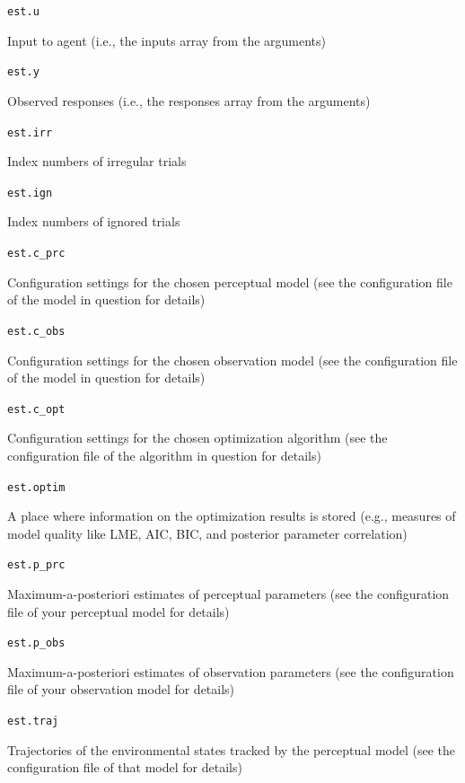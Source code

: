 \documentclass[11pt,a4paper]{article}
\numberwithin{equation}{section}
\begin{document}
\begin{description}
  \item{\texttt{est.u}}

    Input to agent (i.e., the inputs array from the arguments)

  \item{\texttt{est.y}}

    Observed responses (i.e., the responses array from the arguments)

  \item{\texttt{est.irr}}

     Index numbers of irregular trials

   \item{\texttt{est.ign}}

     Index numbers of ignored trials

   \item{\texttt{est.c\_prc}}

     Configuration settings for the chosen perceptual model (see the
     configuration file of the model in question for details)

   \item{\texttt{est.c\_obs}}

     Configuration settings for the chosen observation model (see the
     configuration file of the model in question for details)

   \item{\texttt{est.c\_opt}}

     Configuration settings for the chosen optimization algorithm (see
     the configuration file of the algorithm in question for details)

   \item{\texttt{est.optim}}

     A place where information on the optimization results is stored
     (e.g., measures of model quality like LME, AIC, BIC, and
     posterior parameter correlation)

   \item{\texttt{est.p\_prc}}

     Maximum-a-posteriori estimates of perceptual parameters (see the
     configuration file of your perceptual model for details)

   \item{\texttt{est.p\_obs}}

     Maximum-a-posteriori estimates of observation parameters (see the
     configuration file of your observation model for details)

   \item{\texttt{est.traj}}

     Trajectories of the environmental states tracked by the
     perceptual model (see the configuration file of that model for
     details)

\end{description}
\end{document}
